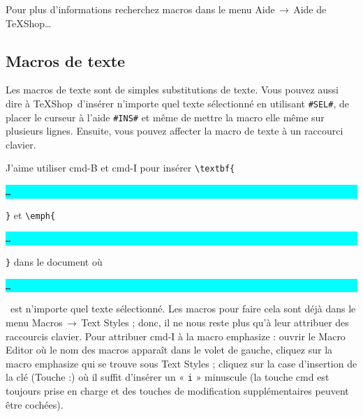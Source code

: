 \documentclass[11pt,french]{article}
\newcommand{\TS}{\textsf{\TeX Shop}}
\newcommand{\cmd}[1]{\textsf{#1}}
\newcommand{\mnu}[1]{\textsf{#1}}
\newcommand{\To}{\,\(\to\)\,}
\newcommand{\selection}{\colorbox{cyan}{\rule[-0.5ex]{0ex}{2.1ex}\texttt{…}}}
\begin{document}

Pour plus d'informations recherchez \cmd{macros} dans le menu \mnu{Aide}\To\mnu{Aide de TeXShop…}

\subsection{Macros de texte} 

Les macros de texte sont de simples substitutions de texte. Vous pouvez aussi dire à \TS\ d'insérer n'importe quel texte sélectionné en utilisant \verb|#SEL#|, de placer le curseur à l'aide \verb|#INS#| et même de mettre la macro elle même sur plusieurs lignes. Ensuite, vous pouvez affecter la macro de texte à un raccourci clavier.

J'aime utiliser \cmd{cmd-B} et \cmd{cmd-I} pour insérer \verb|\textbf{|\selection\verb|}| et \verb|\emph{|\selection\verb|}| dans le document où \selection\ est n'importe quel texte sélectionné. Les macros pour faire cela sont déjà dans le menu \mnu{Macros}\To\mnu{Text Styles} ; donc, il ne nous reste plus qu'à leur attribuer des raccourcis clavier. Pour attribuer \cmd{cmd-I} à la macro \mnu{emphasize} : ouvrir le \mnu{Macro Editor} où le nom des macros apparaît dans le volet de gauche, cliquez sur la macro \mnu{emphasize} qui se trouve sous \mnu{Text Styles} ; cliquez sur la case d'insertion de la clé (\mnu{Touche :}) où il suffit d'insérer un « \texttt{i} » minuscule (la touche \cmd{cmd} est toujours prise en charge et des touches de modification supplémentaires peuvent être cochées).

\end{document}
